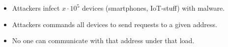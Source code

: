 \begin{frame}
  \begin{example}[DDoS]
    \begin{itemize}
      \item Attackers infect \(x\cdot 10^5\) devices (smartphones, IoT-stuff) 
        with malware.
      \item Attackers commands all devices to send requests to a given address.
      \item No one can communicate with that address under that load.
    \end{itemize}
  \end{example}
\end{frame}



\begin{frame}[allowframebreaks]
  \small
  \printbibliography
\end{frame}

